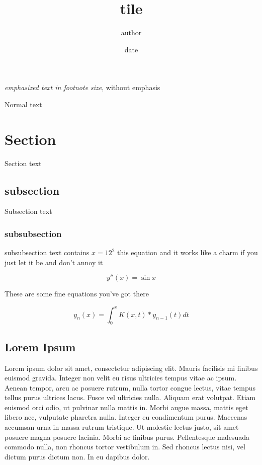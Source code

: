 \documentclass[12pt, a4paper, reqno]{amsart}
\title{tile}
\author{author}
\date{date}
\begin{document}
\begin{minipage}[b]{15cm}
\begin{footnotesize}
        
\emph{emphasized text in footnote size}, without emphasis \qquad %

\bigskip    %

\end{footnotesize}
\end{minipage}

\maketitle

Normal text

\section{Section}

Section text

\subsection{subsection}

Subsection text

\subsubsection{subsubsection}

subsubsection text contains $ x=12^2 $ this equation and it works like a charm
if you just let it be and don't annoy it

\begin{equation} 
    y''(x)=\sin{x}
\end{equation}

These are some fine equations you've got there

\begin{equation}
    y_n(x)=\int_0^x{K(x,t) * y_{n-1}(t)}{dt}
\end{equation}

\subsection{Lorem Ipsum}



Lorem ipsum dolor sit amet, consectetur adipiscing elit. Mauris facilisis mi finibus euismod gravida. Integer non velit eu risus ultricies tempus vitae ac ipsum. Aenean tempor, arcu ac posuere rutrum, nulla tortor congue lectus, vitae tempus tellus purus ultrices lacus. Fusce vel ultricies nulla. Aliquam erat volutpat. Etiam euismod orci odio, ut pulvinar nulla mattis in. Morbi augue massa, mattis eget libero nec, vulputate pharetra nulla. Integer eu condimentum purus. Maecenas accumsan urna in massa rutrum tristique. Ut molestie lectus justo, sit amet posuere magna posuere lacinia. Morbi ac finibus purus. Pellentesque malesuada commodo nulla, non rhoncus tortor vestibulum in. Sed rhoncus lectus nisi, vel dictum purus dictum non. In eu dapibus dolor.
\end{document}
